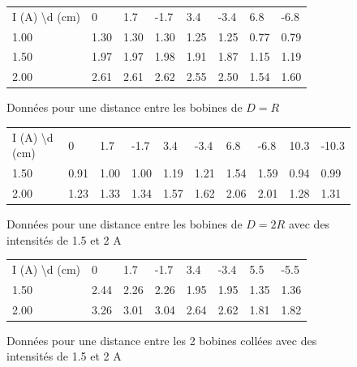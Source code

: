 \documentclass[a4paper,9pt,french]{scrartcl}
\begin{document}
\begin{figure}[H]
\begin{center}
\begin{tabular}{llllllll}
I (A)  \textbackslash d (cm) & 0 & 1.7 & -1.7 & 3.4 & -3.4 & 6.8 & -6.8\\
1.00&1.30 & 1.30 & 1.30 & 1.25 & 1.25 & 0.77 & 0.79 \\
1.50&1.97 & 1.97 & 1.98 & 1.91 & 1.87 & 1.15 & 1.19 \\
2.00&2.61 & 2.61 & 2.62 & 2.55 & 2.50 & 1.54 & 1.60
\end{tabular}
\end{center}
\caption{Données pour une distance entre les bobines de \(D = R\)}
\end{figure}

\begin{figure}[H]
\begin{center}
\begin{tabular}{llllllllll}
I (A)  \textbackslash d (cm) & 0 & 1.7 & -1.7 & 3.4 & -3.4 & 6.8 & -6.8 &10.3&-10.3\\
1.50&0.91 & 1.00 & 1.00 & 1.19 & 1.21 & 1.54 & 1.59&0.94&0.99 \\
2.00&1.23 & 1.33 & 1.34 & 1.57 & 1.62 & 2.06 & 2.01 &1.28&1.31
\end{tabular}
\end{center}
\caption{Données pour une distance entre les bobines de \(D = 2R\) avec des intensités de 1.5 et 2 A}
\end{figure}

\begin{figure}[H]
\begin{center}
\begin{tabular}{llllllll}
I (A)  \textbackslash d (cm) & 0 & 1.7 & -1.7 & 3.4 & -3.4 & 5.5 & -5.5\\
1.50&2.44 & 2.26 & 2.26 & 1.95 & 1.95 & 1.35 & 1.36 \\
2.00&3.26 & 3.01 & 3.04 & 2.64 & 2.62 & 1.81 & 1.82
\end{tabular}
\end{center}
\caption{Données pour une distance entre les 2 bobines collées avec des intensités de 1.5 et 2 A}
\end{figure}
\end{document}
